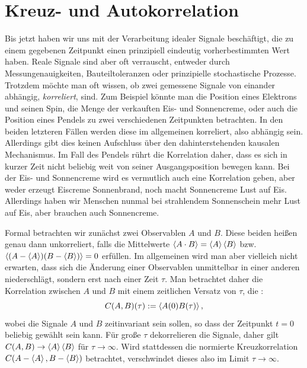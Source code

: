 \section{Kreuz- und Autokorrelation}

Bis jetzt haben wir uns mit der Verarbeitung idealer Signale
beschäftigt, die zu einem gegebenen Zeitpunkt einen prinzipiell
eindeutig vorherbestimmten Wert haben.  Reale Signale sind aber oft
verrauscht, entweder durch Messungenauigkeiten, Bauteiltoleranzen oder
prinzipielle stochastische Prozesse.  Trotzdem möchte man oft wissen,
ob zwei gemessene Signale von einander abhängig, \emph{korreliert},
sind. Zum Beispiel könnte man die Position eines Elektrons und seinen
Spin, die Menge der verkauften Eis- und Sonnencreme, oder auch die
Position eines Pendels zu zwei verschiedenen Zeitpunkten betrachten.
In den beiden letzteren Fällen werden diese im allgemeinen korreliert,
also abhängig sein. Allerdings gibt dies keinen Aufschluss über den
dahinterstehenden kausalen Mechanismus. Im Fall des Pendels rührt die
Korrelation daher, dass es sich in kurzer Zeit nicht beliebig weit von
seiner Ausgangsposition bewegen kann. Bei der Eis- und Sonnencreme
wird es vermutlich auch eine Korrelation geben, aber weder erzeugt
Eiscreme Sonnenbrand, noch macht Sonnencreme Lust auf Eis. Allerdings
haben wir Menschen nunmal bei strahlendem Sonnenschein mehr Lust auf
Eis, aber brauchen auch Sonnencreme.

Formal betrachten wir zunächst zwei Observablen $A$ und $B$. Diese
beiden heißen genau dann unkorreliert, falls die Mittelwerte
$\left\langle{A\cdot B}\right\rangle = \left\langle{A}\right\rangle\left\langle{B}\right\rangle$
bzw. $\left\langle{(A-\left\langle{A}\right\rangle)(B-\left\langle{B}\right\rangle)}\right\rangle=0$ erfüllen.  Im allgemeinen
wird man aber vielleich nicht erwarten, dass sich die Änderung einer
Observablen unmittelbar in einer anderen niederschlägt, sondern erst
nach einer Zeit $\tau$.  Man betrachtet daher die Korrelation zwischen
$A$ und $B$ mit einem zeitlichen Versatz von $\tau$, die
\emph{}:
\begin{equation}
  \label{eq:crosscorr}
  C(A,B)(\tau) := \left\langle{A(0)B(\tau)}\right\rangle,
\end{equation}
wobei die Signale $A$ und $B$ zeitinvariant sein sollen, so dass der
Zeitpunkt $t=0$ beliebig gewählt sein kann. Für große $\tau$
dekorrelieren die Signale, daher gilt $C(A,B)\to \left\langle{A}\right\rangle\left\langle{B}\right\rangle$ für
$\tau\to\infty$. Wird stattdessen die normierte Kreuzkorrelation
$C(A-\left\langle{A}\right\rangle, B-\left\langle{B}\right\rangle)$ betrachtet, verschwindet dieses also im
Limit $\tau\to\infty$.

